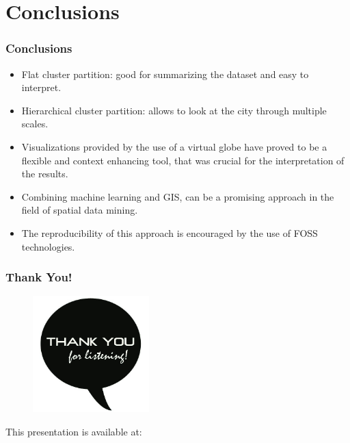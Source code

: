 \documentclass[hyperref={pdfpagelabels=true}]{beamer}
\begin{document}
\section{Conclusions}
\begin{frame}
\frametitle{Conclusions}
    \begin{itemize}    
      \item<2->Flat cluster partition: good for summarizing the dataset and easy to interpret.
      \item<3->Hierarchical cluster partition: allows to look at the city through multiple scales.%
      \item<4->Visualizations provided by the use of a virtual globe have proved to be a flexible and context enhancing tool, that was crucial for the interpretation of the results.
      \item<5->Combining machine learning and GIS, can be a promising approach in the field of spatial data mining.
      \item<6->The reproducibility of this approach is encouraged by the use of FOSS technologies.      
     \end{itemize}
\end{frame}

\begin{frame}
\frametitle{Thank You!}
    \begin{figure}   
      \includegraphics[width=0.4\textwidth]{thanks.jpg}      
    \end{figure}   
    This presentation is available at: 
      \vspace{5mm}    
\end{frame}
\end{document}
